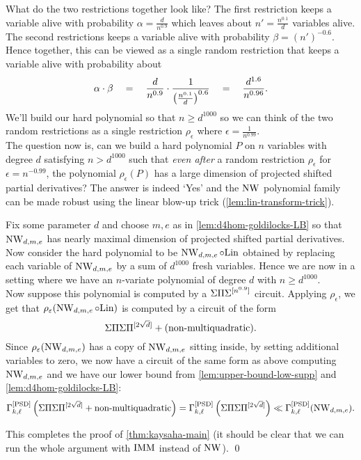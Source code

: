 What do the two restrictions together look like? The first restriction keeps a variable alive with probability $\alpha = \frac{d}{n^{0.9}}$ which leaves about $n' = \frac{n^{0.1}}{d}$ variables alive. The second restrictions keeps a variable alive with probability $\beta = (n')^{-0.6}$. Hence together, this can be viewed as a single random restriction that keeps a variable alive with probability about
\[
\alpha \cdot \beta \quad = \quad \frac{d}{n^{0.9}} \cdot \frac{1}{\left(\frac{n^{0.1}}{d}\right)^{0.6}} \quad = \quad \frac{d^{1.6}}{n^{0.96}}.
\]
We'll build our hard polynomial so that $n \geq d^{1000}$ so we can think of the two random restrictions as a single restriction $\rho_\epsilon$ where $\epsilon = \frac{1}{n^{0.99}}$.\\

The question now is, can we build a hard polynomial $P$ on $n$ variables with degree $d$ satisfying $n > d^{1000}$ such that \emph{even after} a random restriction $\rho_\epsilon$ for $\epsilon = n^{-0.99}$, the polynomial $\rho_\epsilon(P)$ has a large dimension of projected shifted partial derivatives? The answer is indeed `Yes' and the $\operatorname{\mathrm{NW}}$ polynomial family can be made robust using the linear blow-up trick (\autoref{lem:lin-transform-trick}). 

Fix some parameter $d$ and choose $m,e$ as in \autoref{lem:d4hom-goldilocks-LB} so that $\operatorname{\mathrm{NW}}_{d,m,e}$ has nearly maximal dimension of projected shifted partial derivatives. Now consider the hard polynomial to be $\operatorname{\mathrm{NW}}_{d,m,e} \circ \mathrm{Lin}$ obtained by replacing each variable of $\operatorname{\mathrm{NW}}_{d,m,e}$ by a sum of $d^{1000}$ fresh variables. Hence we are now in a setting where we have an $n$-variate polynomial of degree $d$ with $n \geq d^{1000}$. \\

Now suppose this polynomial is computed by a $\Sigma\Pi\Sigma^{[n^{0.9}]}$ circuit. Applying $\rho_\epsilon$, we get that $\rho_\varepsilon(\operatorname{\mathrm{NW}}_{d,m,e} \circ \mathrm{Lin})$ is computed by a circuit of the form 
\[
\Sigma\Pi\Sigma\Pi^{[2\sqrt{d}]} + (\text{non-multiquadratic}).
\]
Since $\rho_\varepsilon(\operatorname{\mathrm{NW}}_{d,m,e})$ has a copy of $\operatorname{\mathrm{NW}}_{d,m,e}$ sitting inside, by setting additional variables to zero, we now have a circuit of the same form as above computing $\operatorname{\mathrm{NW}}_{d,m,e}$ and we have our lower bound from \autoref{lem:upper-bound-low-supp} and \autoref{lem:d4hom-goldilocks-LB}:
\[
\Gamma^{\mathrm{[PSD]}}_{k,\ell}\left(\Sigma\Pi\Sigma\Pi^{[2\sqrt{d}]} + \text{non-multiquadratic}\right) =  \Gamma^{\mathrm{[PSD]}}_{k,\ell}\left(\Sigma\Pi\Sigma\Pi^{[2\sqrt{d}]}\right) \ll \Gamma^{\mathrm{[PSD]}}_{k,\ell}(\operatorname{\mathrm{NW}}_{d,m,e}). 
\]

This completes the proof of \autoref{thm:kaysaha-main} (it should be clear that we can run the whole argument with $\operatorname{\mathrm{IMM}}$ instead of $\operatorname{\mathrm{NW}}$). \qed\\

